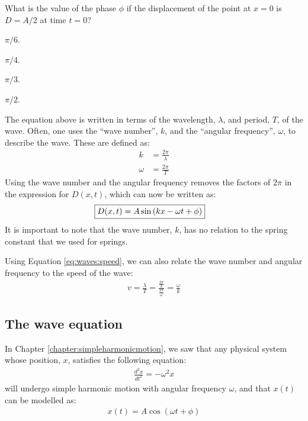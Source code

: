 \begin{checkpoint}
\begin{MCquestion}{What is the value of the phase $\phi$ if the displacement of the point at $x=0$ is $D=A/2$ at time $t=0$?}
\item $\pi/6$.\correct
\item $\pi/4$.
\item $\pi/3$.
\item $\pi/2$.
\end{MCquestion}
\end{checkpoint}

The equation above is written in terms of the wavelength, $\lambda$, and period, $T$, of the wave. Often, one uses the ``wave number'', $k$, and the ``angular frequency'', $\omega$, to describe the wave. These are defined as:
\begin{align}
k &= \frac{2\pi}{\lambda}\\
\omega &= \frac{2\pi}{T}
\end{align} 
Using the wave number and the angular frequency removes the factors of $2\pi$ in the expression for $D(x,t)$, which can now be written as:
\begin{align}
\Aboxed{D(x,t) = A\sin\left( kx -\omega t + \phi \right)}
\end{align}
It is important to note that the wave number, $k$, has no relation to the spring constant that we used for springs.

Using Equation \ref{eq:waves:speed}, we can also relate the wave number and angular frequency to the speed of the wave:
\begin{align*}
v = \frac{\lambda}{T}=\frac{\frac{2\pi}{k}}{\frac{2\pi}{\omega}}=\frac{\omega}{k}
\end{align*}

\subsection{The wave equation}
\label{sec:waves:waveequation}
In Chapter \ref{chapter:simpleharmonicmotion}, we saw that any physical system whose position, $x$, satisfies the following equation:
\begin{align*}
\frac{d^2x}{dt^2}=-\omega^2 x
\end{align*}
will undergo simple harmonic motion with angular frequency $\omega$, and that $x(t)$ can be modelled as:
\begin{align*}
x(t) = A\cos(\omega t + \phi)
\end{align*}


